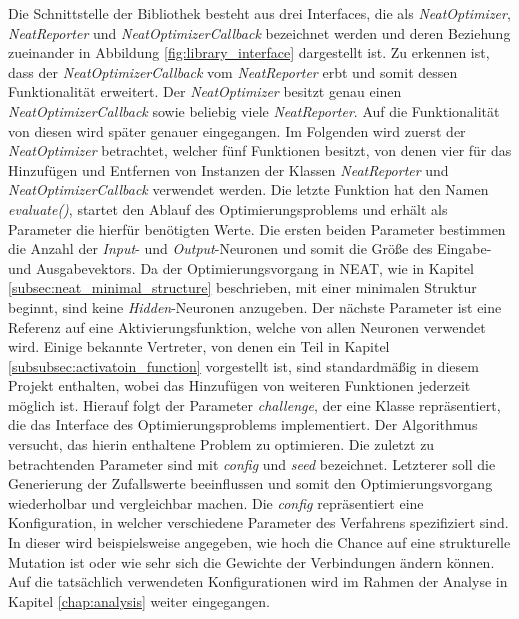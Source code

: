 Die Schnittstelle der Bibliothek besteht aus drei Interfaces, die als \emph{NeatOptimizer}, \emph{NeatReporter} und \emph{NeatOptimizerCallback} bezeichnet werden und deren Beziehung zueinander in Abbildung \ref{fig:library_interface} dargestellt ist. Zu erkennen ist, dass der \emph{NeatOptimizerCallback} vom \emph{NeatReporter} erbt und somit dessen Funktionalität erweitert. Der \emph{NeatOptimizer} besitzt genau einen \emph{NeatOptimizerCallback} sowie beliebig viele \emph{NeatReporter}. Auf die Funktionalität von diesen wird später genauer eingegangen. Im Folgenden wird zuerst der \emph{NeatOptimizer} betrachtet, welcher fünf Funktionen besitzt, von denen vier für das Hinzufügen und Entfernen von Instanzen der Klassen \emph{NeatReporter} und \emph{NeatOptimizerCallback} verwendet werden. Die letzte Funktion hat den Namen \emph{evaluate()}, startet den Ablauf des Optimierungsproblems und erhält als Parameter die hierfür benötigten Werte. Die ersten beiden Parameter bestimmen die Anzahl der \emph{Input}- und \emph{Output}-Neuronen und somit die Größe des Eingabe- und Ausgabevektors. Da der Optimierungsvorgang in \ac{NEAT}, wie in Kapitel \ref{subsec:neat_minimal_structure}  beschrieben, mit einer minimalen Struktur beginnt, sind keine \emph{Hidden}-Neuronen anzugeben. Der nächste Parameter ist eine Referenz auf eine Aktivierungsfunktion, welche von allen Neuronen verwendet wird. Einige bekannte Vertreter, von denen ein Teil in Kapitel \ref{subsubsec:activatoin_function} vorgestellt ist, sind standardmäßig in diesem Projekt enthalten, wobei das Hinzufügen von weiteren Funktionen jederzeit möglich ist. Hierauf folgt der Parameter \emph{challenge}, der eine Klasse repräsentiert, die das Interface des Optimierungsproblems implementiert. Der Algorithmus versucht, das hierin enthaltene Problem zu optimieren. Die zuletzt zu betrachtenden Parameter sind mit \emph{config} und \emph{seed} bezeichnet. Letzterer soll die Generierung der Zufallswerte beeinflussen und somit den Optimierungsvorgang wiederholbar und vergleichbar machen. Die \emph{config} repräsentiert eine Konfiguration, in welcher verschiedene Parameter des Verfahrens spezifiziert sind. In dieser wird beispielsweise angegeben, wie hoch die Chance auf eine strukturelle Mutation ist oder wie sehr sich die Gewichte der Verbindungen ändern können. Auf die tatsächlich verwendeten Konfigurationen wird im Rahmen der Analyse in Kapitel \ref{chap:analysis} weiter eingegangen.
\\\\
